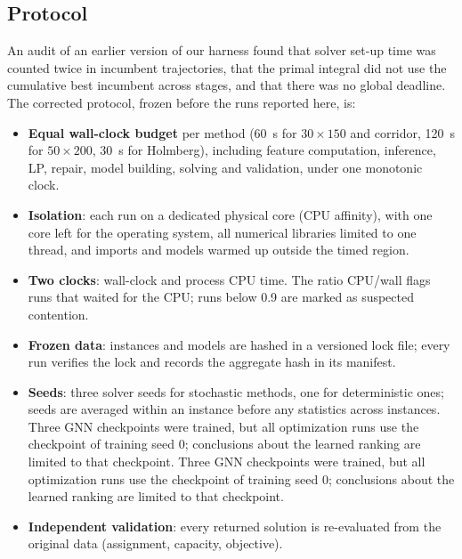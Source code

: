 \subsection{Protocol}\label{sec:protocol}
An audit of an earlier version of our harness found that solver set-up time was counted twice in
incumbent trajectories, that the primal integral did not use the cumulative best incumbent across
stages, and that there was no global deadline. The corrected protocol, frozen before the runs
reported here, is:
\begin{itemize}
\item \textbf{Equal wall-clock budget} per method (60~s for $30\times150$ and corridor, 120~s for
$50\times200$, 30~s for Holmberg), including feature computation, inference, LP, repair, model
building, solving and validation, under one monotonic clock.
\item \textbf{Isolation}: each run on a dedicated physical core (CPU affinity), with one core left
for the operating system, all numerical libraries limited to one thread, and imports and models
warmed up outside the timed region.
\item \textbf{Two clocks}: wall-clock and process CPU time. The ratio CPU/wall flags runs that
waited for the CPU; runs below 0.9 are marked as suspected contention.
\item \textbf{Frozen data}: instances and models are hashed in a versioned lock file; every run
verifies the lock and records the aggregate hash in its manifest.
\item \textbf{Seeds}: three solver seeds for stochastic methods, one for deterministic ones; seeds
are averaged within an instance before any statistics across instances. Three GNN checkpoints
were trained, but all optimization runs use the checkpoint of training seed 0; conclusions about
the learned ranking are limited to that checkpoint. Three GNN checkpoints
were trained, but all optimization runs use the checkpoint of training seed 0; conclusions about
the learned ranking are limited to that checkpoint.
\item \textbf{Independent validation}: every returned solution is re-evaluated from the original
data (assignment, capacity, objective).
\end{itemize}

